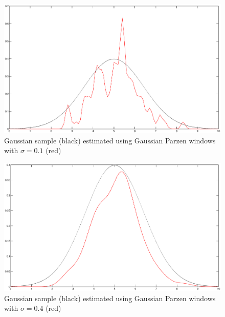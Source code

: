 \begin{figure}
\label{fig:parzen1}
\includegraphics[scale=0.4]{nonpar-parzen-01}
\caption{Gaussian sample (black) estimated using Gaussian Parzen windows
with $\sigma=0.1$ (red)}
\end{figure}

\begin{figure}
\label{fig:parzen4}
\includegraphics[scale=0.4]{nonpar-parzen-04}
\caption{Gaussian sample (black) estimated using Gaussian Parzen windows
with $\sigma=0.4$ (red)}
\end{figure}